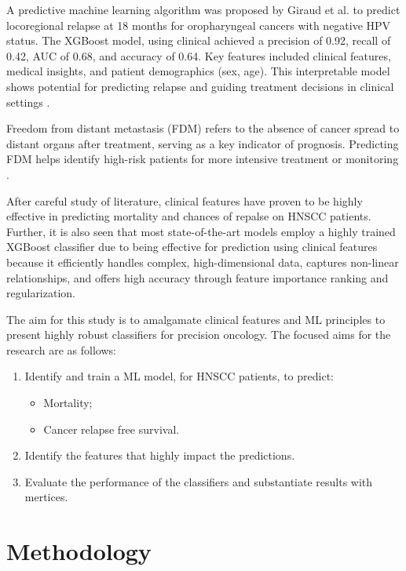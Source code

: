 \documentclass[conference]{IEEEtran}
\begin{document}
A predictive machine learning algorithm was proposed by Giraud et al. to predict locoregional relapse at 18 months for oropharyngeal cancers with negative HPV status. The XGBoost model, using clinical achieved a precision of 0.92, recall of 0.42, AUC of 0.68, and accuracy of 0.64. Key features included clinical features, medical insights, and patient demographics (sex, age). This interpretable model shows potential for predicting relapse and guiding treatment decisions in clinical settings \cite{b10}.

Freedom from distant metastasis (FDM) refers to the absence of cancer spread to distant organs after treatment, serving as a key indicator of prognosis. Predicting FDM helps identify high-risk patients for more intensive treatment or monitoring \cite{b11, 12}.

After careful study of literature, clinical features have proven to be highly effective in predicting mortality and chances of repalse on HNSCC patients. Further, it is also seen that most state-of-the-art models employ a highly trained XGBoost classifier due to being effective for prediction using clinical features because it efficiently handles complex, high-dimensional data, captures non-linear relationships, and offers high accuracy through feature importance ranking and regularization.

The aim for this study is to amalgamate clinical features and ML principles to present highly robust classifiers for precision oncology. The focused aims for the research are as follows:
\begin{enumerate}
    \item Identify and train a ML model, for HNSCC patients, to predict:
    \begin{itemize}
        \item Mortality;
        \item Cancer relapse free survival.
    \end{itemize}
    \item Identify the features that highly impact the predictions.
    \item Evaluate the performance of the classifiers and substantiate results with mertices. 
\end{enumerate}

\section{Methodology}
\end{document}
